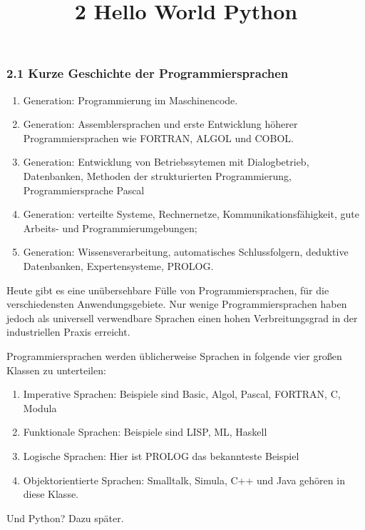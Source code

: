 \documentclass[
  11pt,
  a4paper,
  DIV=11,
  numbers=noendperiod]{scrartcl}
\title{2 Hello World Python}
\author{}
\date{}
\begin{document}
\maketitle


\subsubsection{2.1 Kurze Geschichte der
Programmiersprachen}\label{kurze-geschichte-der-programmiersprachen}

\begin{enumerate}
\def\labelenumi{\arabic{enumi}.}
\item
  Generation: Programmierung im Maschinencode.
\item
  Generation: Assemblersprachen und erste Entwicklung höherer
  Programmiersprachen wie FORTRAN, ALGOL und COBOL.
\item
  Generation: Entwicklung von Betriebssytemen mit Dialogbetrieb,
  Datenbanken, Methoden der strukturierten Programmierung,
  Programmiersprache Pascal
\item
  Generation: verteilte Systeme, Rechnernetze, Kommunikationsfähigkeit,
  gute Arbeits- und Programmierumgebungen;
\item
  Generation: Wissensverarbeitung, automatisches Schlussfolgern,
  deduktive Datenbanken, Expertensysteme, PROLOG.
\end{enumerate}

Heute gibt es eine unübersehbare Fülle von Programmiersprachen, für die
verschiedensten Anwendungsgebiete. Nur wenige Programmiersprachen haben
jedoch als universell verwendbare Sprachen einen hohen Verbreitungsgrad
in der industriellen Praxis erreicht.

Programmiersprachen werden üblicherweise Sprachen in folgende vier
großen Klassen zu unterteilen:

\begin{enumerate}
\def\labelenumi{\arabic{enumi}.}
\item
  Imperative Sprachen: Beispiele sind Basic, Algol, Pascal, FORTRAN, C,
  Modula
\item
  Funktionale Sprachen: Beispiele sind LISP, ML, Haskell
\item
  Logische Sprachen: Hier ist PROLOG das bekannteste Beispiel
\item
  Objektorientierte Sprachen: Smalltalk, Simula, C++ und Java gehören in
  diese Klasse.
\end{enumerate}

Und Python? Dazu später.
\end{document}
